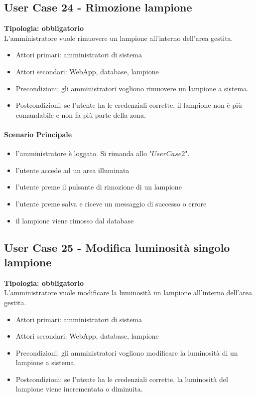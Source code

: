 \documentclass[12pt]{article}
\begin{document}
\subsection{User Case 24 - Rimozione lampione}
\textbf{Tipologia: obbligatorio}\\
L'amministratore vuole rimuovere un lampione all'interno dell'area gestita.
\begin{itemize}
	\item Attori primari: amministratori di sistema
	\item Attori secondari: WebApp, database, lampione
	\item Precondizioni: gli amministratori vogliono rimuovere un lampione a sistema.\\
	\item Postcondizioni: se l'utente ha le credenziali corrette, il lampione non è più comandabile e non fa più parte della zona.
\end{itemize}
\paragraph{Scenario Principale}
\begin{itemize}
	\item l'amministratore è loggato. Si rimanda allo "$User Case 2$".
	\item l'utente accede ad un area illuminata
	\item l'utente preme il pulsante di rimozione di un lampione
	\item l'utente preme salva e riceve un messaggio di successo o errore
	\item il lampione viene rimosso dal database
\end{itemize}

\subsection{User Case 25 - Modifica luminosità singolo lampione}
\textbf{Tipologia: obbligatorio}\\
L'amministratore vuole modificare la luminosità un lampione all'interno dell'area gestita.
\begin{itemize}
	\item Attori primari: amministratori di sistema
	\item Attori secondari: WebApp, database, lampione
	\item Precondizioni: gli amministratori vogliono modificare la luminosità di un lampione a sistema.\\
	\item Postcondizioni: se l'utente ha le credenziali corrette, la luminosità del lampione viene incrementata o diminuita.
\end{itemize}
\end{document}
